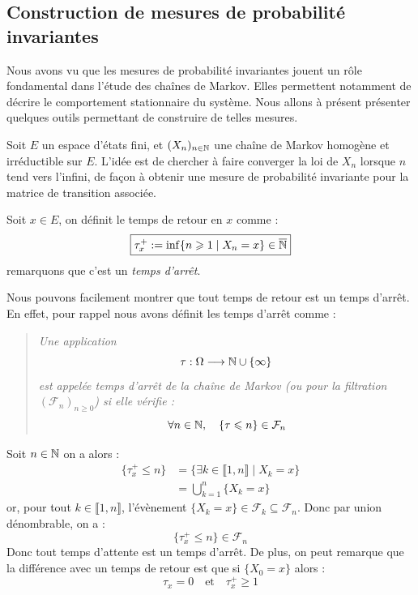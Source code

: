 \subsection{Construction de mesures de probabilité invariantes}

Nous avons vu que les mesures de probabilité invariantes jouent un rôle fondamental dans l’étude des chaînes de Markov. 
Elles permettent notamment de décrire le comportement stationnaire du système. 
Nous allons à présent présenter quelques outils permettant de construire de telles mesures.

Soit $E$ un espace d’états fini, et $(X_n)_{n \in \mathbb{N}}$ une chaîne de Markov homogène et irréductible sur $E$.  
L’idée est de chercher à faire converger la loi de $X_n$ lorsque $n$ tend vers l’infini, de façon à obtenir une mesure de probabilité invariante pour la matrice de transition associée.

\begin{definition}
    Soit $x \in E$, on définit le temps de retour en $x$ comme : 
        $$ \boxed{\tau_x^+ := \inf \{ n \geqslant 1 \; | \; X_n = x \} \in \overline{\mathbb{N}}} $$ 
    remarquons que c'est un \emph{temps d'arrêt}.  
\end{definition}

\begin{remark}
    Nous pouvons facilement montrer que tout temps de retour est un temps d'arrêt. 
    En effet, pour rappel nous avons définit les temps d'arrêt comme : 
        \begin{quote}
            \emph{Une application
                \[ {\tau : \Omega \longrightarrow \mathbb{N} \cup \{\infty\}} \]
            est appelée \emph{temps d'arrêt} de la chaîne de Markov (ou pour la filtration $(\mathcal{F}_n)_{n \geqslant 0}$) si elle vérifie :
                \[ { \forall n \in \mathbb{N}, \quad \{ \tau \leqslant n \} \in \mathcal{F}_n} \]}
        \end{quote}
    Soit $n \in \mathbb{N}$ on a alors : 
        \begin{align*}
            \{ \tau_x^+ \leqslant n\} &= \{ \exists k \in \llbracket 1, n \rrbracket \; | \; X_k = x\} \\ 
            &= \bigcup_{k = 1}^{n} \{X_k = x\}
        \end{align*}
    or, pour tout $ k \in \llbracket 1, n \rrbracket $, l'évènement $ \{X_k = x\} \in \mathcal{F}_k \subseteq \mathcal{F}_n$. 
    Donc par union dénombrable, on a : 
        $$ \{ \tau_x^+ \leqslant n\} \in \mathcal{F}_n $$ 
    Donc tout temps d'attente est un temps d'arrêt. De plus, on peut remarque que la différence avec un temps de retour 
    est que si $ \{ X_0 = x \}$ alors : 
            $$ \tau_x = 0 \quad \text{et} \quad \tau_x^+ \geqslant 1 $$  
\end{remark}


